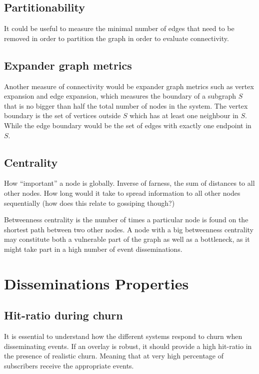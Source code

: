 \subsection{Partitionability}

It could be useful to measure the minimal number of edges that
need to be removed in order to partition the graph in order to
evaluate connectivity.

\subsection{Expander graph metrics}
Another measure of connectivity would be expander graph metrics
such as vertex expansion and edge expansion, which measures the
boundary of a subgraph $S$ that is no bigger than half the total
number of nodes in the system. The vertex boundary is the set of
vertices outside $S$ which has at least one neighbour in $S$.
While the edge boundary would be the set of edges with exactly
one endpoint in $S$.

\subsection{Centrality}


How ``important'' a node is globally. Inverse of farness, the sum of
distances to all other nodes. How long would it take to spread
information to all other nodes sequentially (how does this relate to
gossiping though?)

Betweenness centrality is the number of times a particular node
is found on the shortest path between two other nodes. A node
with a big betweenness centrality may constitute both a
vulnerable part of the graph as well as a bottleneck, as it
might take part in a high number of event disseminations.

\section{Disseminations Properties}

\subsection{Hit-ratio during churn}

It is essential to understand how the different systems respond to
churn when disseminating events. If an overlay is robust, it should
provide a high hit-ratio in the presence of realistic churn.
Meaning that at very high percentage of subscribers receive the
appropriate events.

